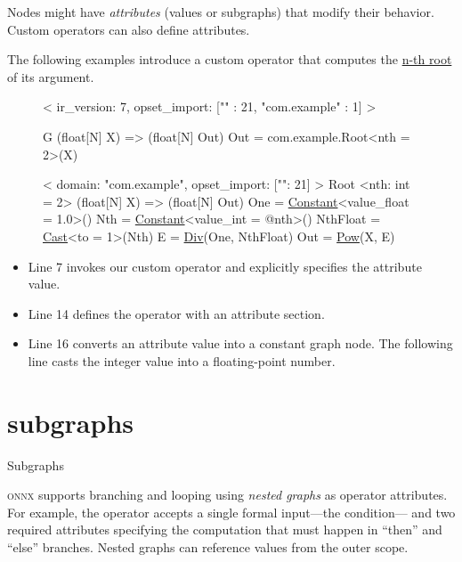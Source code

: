 \documentclass{article}
\begin{document}
Nodes might have \emph{attributes} (values or subgraphs) that modify their behavior.
Custom operators can also define attributes.

The following examples introduce a custom  operator that computes the \href{https://en.wikipedia.org/wiki/Nth_root}{n-th root} of its argument.

\begin{figure}
\begin{code}[linenumbers]
<
    ir_version: 7,
    opset_import: ["" : 21, "com.example" : 1]
>

G (float[N] X) => (float[N] Out) {
    Out = com.example.Root<nth = 2>(X)
}

<
    domain: "com.example",
    opset_import: ["": 21]
>
Root <nth: int = 2> (float[N] X) => (float[N] Out) {
    One = \href{https://onnx.ai/onnx/operators/onnx__Constant.html}{Constant}<value_float = 1.0>()
    Nth = \href{https://onnx.ai/onnx/operators/onnx__Constant.html}{Constant}<value_int = @nth>()
    NthFloat = \href{https://onnx.ai/onnx/operators/onnx__Cast.html}{Cast}<to = 1>(Nth)
    E = \href{https://onnx.ai/onnx/operators/onnx__Div.html}{Div}(One, NthFloat)
    Out = \href{https://onnx.ai/onnx/operators/onnx__Pow.html}{Pow}(X, E)
}
\end{code}
\end{figure}

\begin{itemize}
\item
  Line 7 invokes our custom operator and explicitly specifies the  attribute value.
\item
  Line 14 defines the  operator with an attribute section.
\item
  Line 16 converts an attribute value into a constant graph node.
  The following line casts the integer value into a floating-point number.
\end{itemize}

\section{subgraphs}{Subgraphs}

\textsc{onnx} supports branching and looping using \emph{nested graphs} as operator attributes.
For example, the  operator accepts a single formal input---the condition---%
and two required attributes specifying the computation
that must happen in ``then'' and ``else'' branches.
Nested graphs can reference values from the outer scope.
\end{document}
